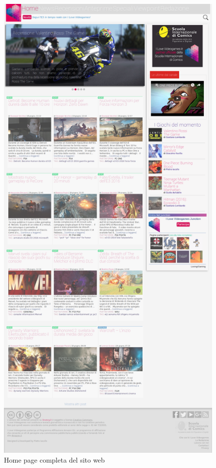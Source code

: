 \documentclass[../ProgettoTecWeb2.tex]{subfiles}
\begin{document}
		\begin{figure} [H]
			\centering
			\includegraphics[scale=0.21]{img/HomePageCompleta}
			\caption{Home page completa del sito web}
		\end{figure}
\end{document}
